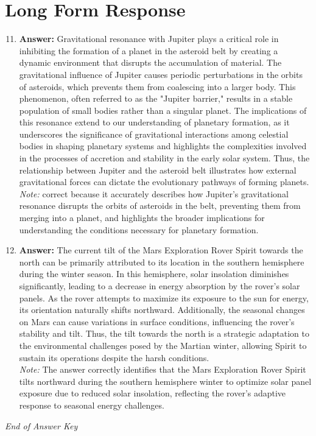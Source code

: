 \documentclass[12pt]{article}
\begin{document}
\section*{Long Form Response}
\begin{enumerate}[label=\arabic*.]
\setcounter{enumi}{10}
\item \textbf{Answer:} Gravitational resonance with Jupiter plays a critical role in inhibiting the formation of a planet in the asteroid belt by creating a dynamic environment that disrupts the accumulation of material. The gravitational influence of Jupiter causes periodic perturbations in the orbits of asteroids, which prevents them from coalescing into a larger body. This phenomenon, often referred to as the "Jupiter barrier," results in a stable population of small bodies rather than a singular planet. The implications of this resonance extend to our understanding of planetary formation, as it underscores the significance of gravitational interactions among celestial bodies in shaping planetary systems and highlights the complexities involved in the processes of accretion and stability in the early solar system. Thus, the relationship between Jupiter and the asteroid belt illustrates how external gravitational forces can dictate the evolutionary pathways of forming planets.
\\ \textit{Note:} correct because it accurately describes how Jupiter's gravitational resonance disrupts the orbits of asteroids in the belt, preventing them from merging into a planet, and highlights the broader implications for understanding the conditions necessary for planetary formation.
\item \textbf{Answer:} The current tilt of the Mars Exploration Rover Spirit towards the north can be primarily attributed to its location in the southern hemisphere during the winter season. In this hemisphere, solar insolation diminishes significantly, leading to a decrease in energy absorption by the rover's solar panels. As the rover attempts to maximize its exposure to the sun for energy, its orientation naturally shifts northward. Additionally, the seasonal changes on Mars can cause variations in surface conditions, influencing the rover's stability and tilt. Thus, the tilt towards the north is a strategic adaptation to the environmental challenges posed by the Martian winter, allowing Spirit to sustain its operations despite the harsh conditions.
\\ \textit{Note:} The answer correctly identifies that the Mars Exploration Rover Spirit tilts northward during the southern hemisphere winter to optimize solar panel exposure due to reduced solar insolation, reflecting the rover's adaptive response to seasonal energy challenges.
\end{enumerate}

\vfill
\noindent\textit{End of Answer Key}
\end{document}
